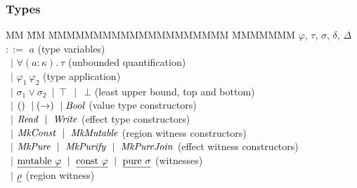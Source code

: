 \subsubsection{Types}
\vspace{-1ex}
\begin{tabbing}
MM 	\= MM \= MMMMMMMMMMMMMMMMMMMM \= MMMMMMM \kill
$\varphi$, $\tau$, $\sigma$, $\delta$, $\Delta$ \\
	\> $::=$	\> $a$							\> (type variables) \\
	\> \ $\mid$	\> $\forall (a : \kappa). \ \tau$			\> (unbounded quantification) \\
	\> \ $\mid$	\> $\varphi_1 \ \varphi_2$				\> (type application) \\
	\> \ $\mid$	\> $\sigma_1 \lor \sigma_2 \ 
				\mid \ \top \ \ \mid  \ \ \bot$			\> (least upper bound, top and bottom) \\
	\> \ $\mid$	\> $() \ \mid (\to) \ \mid \operatorname{\mathit{Bool}}$			\> (value type constructors) \\
	\> \ $\mid$	\> $\operatorname{\mathit{Read}} \ \mid \ \operatorname{\mathit{Write}}$ 				\> (effect type constructors) \\
	\> \ $\mid$	\> $\operatorname{\mathit{MkConst}} \ \mid \ \operatorname{\mathit{MkMutable}}$			\> (region witness constructors) \\
	\> \ $\mid$	\> $\iMkPure \ \mid \ \iMkPurify \ \mid \ \iMkPureJoin$
										\> (effect witness constructors) \\
	\> \ $\mid$	\> $\underline{\textrm{mutable} \ \varphi} 
				\ \mid \ \underline{\textrm{const} \ \varphi}
				\ \mid \ \underline{\textrm{pure} \ \sigma}$		\> (witnesses) \\
	\> \ $\mid$	\> $\underline{\rho}$						\> (region witness) 
\end{tabbing}

\vspace{-2em}
